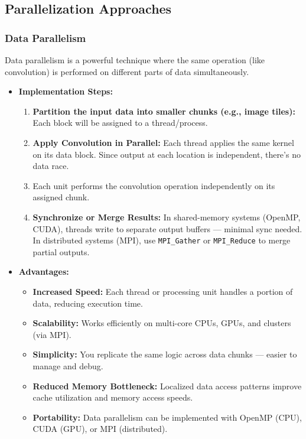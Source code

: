 \documentclass[conference, 10pt]{IEEEtran}
\begin{document}
\begin{itemize}
\begin{itemize}
\subsection{Parallelization Approaches}
\subsubsection{Data Parallelism}
Data parallelism is a powerful technique where the same operation (like convolution) is performed on different parts of data simultaneously.

\begin{itemize}
    \item \textbf{Implementation Steps:}
    \begin{enumerate}
        \item \textbf{Partition the input data into smaller chunks (e.g., image tiles):} Each block will be assigned to a thread/process.
        \item \textbf{Apply Convolution in Parallel:} Each thread applies the same kernel on its data block. Since output at each location is independent, there's no data race.
        \item Each unit performs the convolution operation independently on its assigned chunk.
        \item \textbf{Synchronize or Merge Results:} In shared-memory systems (OpenMP, CUDA), threads write to separate output buffers — minimal sync needed. In distributed systems (MPI), use \texttt{MPI\_Gather} or \texttt{MPI\_Reduce} to merge partial outputs.
    \end{enumerate}
    \item \textbf{Advantages:}
    \begin{itemize}
        \item \textbf{Increased Speed:} Each thread or processing unit handles a portion of data, reducing execution time.
        \item \textbf{Scalability:} Works efficiently on multi-core CPUs, GPUs, and clusters (via MPI).
        \item \textbf{Simplicity:} You replicate the same logic across data chunks — easier to manage and debug.
        \item \textbf{Reduced Memory Bottleneck:} Localized data access patterns improve cache utilization and memory access speeds.
        \item \textbf{Portability:} Data parallelism can be implemented with OpenMP (CPU), CUDA (GPU), or MPI (distributed).
    \end{itemize}
\end{itemize}






\end{itemize}
\end{itemize}
\end{document}
